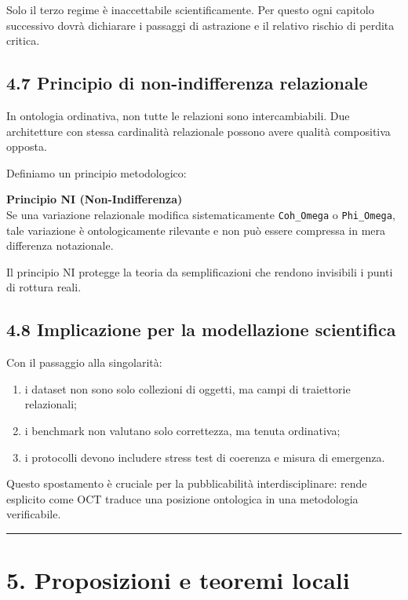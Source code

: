 Solo il terzo regime è inaccettabile scientificamente. Per questo ogni capitolo successivo dovrà dichiarare i passaggi di astrazione e il relativo rischio di perdita critica.

\subsection{4.7 Principio di non-indifferenza relazionale}

In ontologia ordinativa, non tutte le relazioni sono intercambiabili. Due architetture con stessa cardinalità relazionale possono avere qualità compositiva opposta.

Definiamo un principio metodologico:

\textbf{Principio NI (Non-Indifferenza)}\\
Se una variazione relazionale modifica sistematicamente \texttt{Coh\_Omega} o \texttt{Phi\_Omega}, tale variazione è ontologicamente rilevante e non può essere compressa in mera differenza notazionale.

Il principio NI protegge la teoria da semplificazioni che rendono invisibili i punti di rottura reali.

\subsection{4.8 Implicazione per la modellazione scientifica}

Con il passaggio alla singolarità:

\begin{enumerate}
\def\labelenumi{\arabic{enumi}.}
\tightlist
\item
  i dataset non sono solo collezioni di oggetti, ma campi di traiettorie relazionali;
\item
  i benchmark non valutano solo correttezza, ma tenuta ordinativa;
\item
  i protocolli devono includere stress test di coerenza e misura di emergenza.
\end{enumerate}

Questo spostamento è cruciale per la pubblicabilità interdisciplinare: rende esplicito come OCT traduce una posizione ontologica in una metodologia verificabile.

\begin{center}\rule{0.5\linewidth}{0.5pt}\end{center}

\section{5. Proposizioni e teoremi locali}


